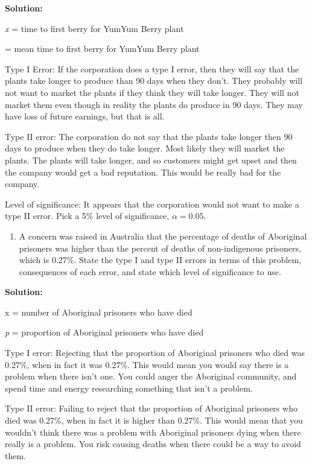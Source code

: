 \documentclass[
]{book}
\providecommand{\tightlist}{%
  \setlength{\itemsep}{0pt}\setlength{\parskip}{0pt}}
\begin{document}
\textbf{Solution:}

\emph{x} = time to first berry for YumYum Berry plant

= mean time to first berry for YumYum Berry plant

Type I Error: If the corporation does a type I error, then they will say that the plants take longer to produce than 90 days when they don't. They probably will not want to market the plants if they think they will take longer. They will not market them even though in reality the plants do produce in 90 days. They may have loss of future earnings, but that is all.

Type II error: The corporation do not say that the plants take longer then 90 days to produce when they do take longer. Most likely they will market the plants. The plants will take longer, and so customers might get upset and then the company would get a bad reputation. This would be really bad for the company.

Level of significance: It appears that the corporation would not want to make a type II error. Pick a 5\% level of significance, \(\alpha=0.05\).

\begin{enumerate}
\def\labelenumi{\alph{enumi}.}
\setcounter{enumi}{1}
\tightlist
\item
  A concern was raised in Australia that the percentage of deaths of Aboriginal prisoners was higher than the percent of deaths of non-indigenous prisoners, which is 0.27\%. State the type I and type II errors in terms of this problem, consequences of each error, and state which level of significance to use.
\end{enumerate}

\textbf{Solution:}

x = number of Aboriginal prisoners who have died

\emph{p} = proportion of Aboriginal prisoners who have died

Type I error: Rejecting that the proportion of Aboriginal prisoners who died was 0.27\%, when in fact it was 0.27\%. This would mean you would say there is a problem when there isn't one. You could anger the Aboriginal community, and spend time and energy researching something that isn't a problem.

Type II error: Failing to reject that the proportion of Aboriginal prisoners who died was 0.27\%, when in fact it is higher than 0.27\%. This would mean that you wouldn't think there was a problem with Aboriginal prisoners dying when there really is a problem. You risk causing deaths when there could be a way to avoid them.
\end{document}
